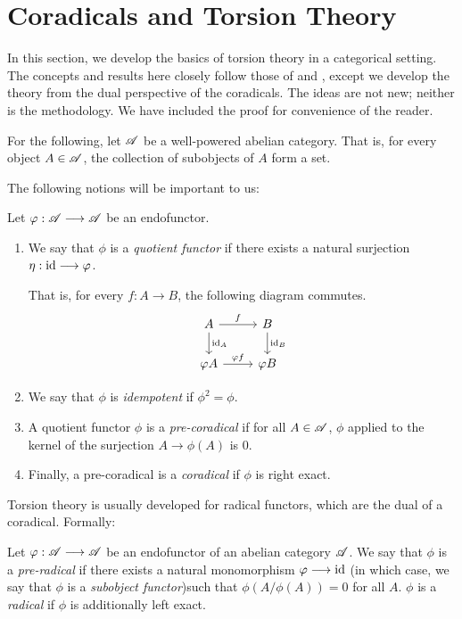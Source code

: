 \newpage
\section{Coradicals and Torsion Theory}\label{sect_torsion_theory}

In this section, we develop the basics of torsion theory in a 
categorical setting. The concepts and results here closely follow
those of \cite{BJV} and \cite{DTor}, except we develop the theory
from the dual perspective of the coradicals. The ideas are not new;
neither is the methodology. We have included the proof for 
convenience of the reader.

For the following, let $\mathscr{A}$ be a well-powered abelian category.
That is, for every object $A \in \mathscr{A}$, the collection of 
subobjects of $A$ form a set.

The following notions will be important to us:

\begin{defn}\label{def_coradical}
Let $\varphi: \mathscr{A} \longrightarrow \mathscr{A}$ be an endofunctor. 
\begin{enumerate}
\item We say that $\phi$ is a \emph{quotient functor} if there 
exists a natural surjection $\eta: \mathrm{id} \longrightarrow \varphi$. 

That is, for every $f: A \to B$, the following diagram commutes.
\[
\begin{tikzcd}
A \arrow{r}{f} \arrow{d}{\id_A} &
B \arrow{d}{\id_B} \\
\phi A \arrow{r}{\phi f} 
&\phi B
\end{tikzcd}
\]

\item We say that $\phi$ is \emph{idempotent} if $\phi^2 = \phi$.

\item A quotient functor $\phi$ is a \emph{pre-coradical} if for all
$A \in \mathscr{A}$, $\phi$ applied to the kernel of the surjection 
$A \to \phi(A)$ is $0$.

\item Finally, a pre-coradical is a \emph{coradical} if $\phi$ is
right exact.
\end{enumerate}
\end{defn}

Torsion theory is usually developed for radical functors, which 
are the dual of a coradical. Formally:

\begin{defn}\label{def_radical}
Let $\varphi: \mathscr{A} \longrightarrow \mathscr{A}$ be an endofunctor of an abelian 
category $\mathscr{A}$. We say that $\phi$ is a \emph{pre-radical} if 
there exists a natural monomorphism $\varphi \longrightarrow \mathrm{id}$ (in which case, we
say that $\phi$ is a \emph{subobject functor})such that 
$\phi(A/\phi(A)) = 0$ for all $A$. $\phi$ is a \emph{radical} if 
$\phi$ is additionally left exact.
\end{defn}

